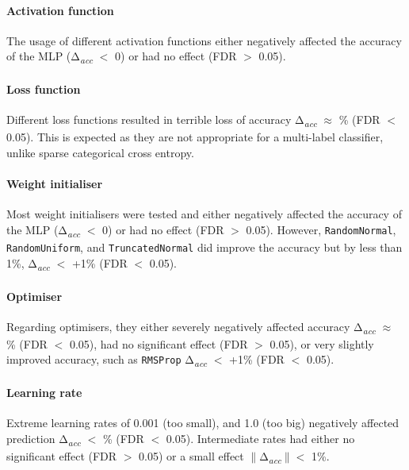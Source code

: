 \paragraph{Activation function}

The usage of different activation functions either negatively affected the accuracy of the MLP (Δ\textsubscript{\textit{acc}} $<$ 0) or had no effect (FDR $>$ 0.05).

\paragraph{Loss function}

Different loss functions resulted in terrible loss of accuracy Δ\textsubscript{\textit{acc}} $\approx$ \% (FDR $<$ 0.05). This is expected as they are not appropriate for a multi-label classifier, unlike sparse categorical cross entropy.

\paragraph{Weight initialiser}

Most weight initialisers were tested and either negatively affected the accuracy of the MLP (Δ\textsubscript{\textit{acc}} $<$ 0) or had no effect (FDR $>$ 0.05). However, \texttt{RandomNormal}, \texttt{RandomUniform}, and \texttt{TruncatedNormal} did improve the accuracy but by less than 1\%, Δ\textsubscript{\textit{acc}} $<$ +1\% (FDR $<$ 0.05).

\paragraph{Optimiser}

Regarding optimisers, they either severely negatively affected accuracy Δ\textsubscript{\textit{acc}} $\approx$ \% (FDR $<$ 0.05), had no significant effect (FDR $>$ 0.05), or very slightly improved accuracy, such as \texttt{RMSProp} Δ\textsubscript{\textit{acc}} $<$ +1\% (FDR $<$ 0.05).

\paragraph{Learning rate}

Extreme learning rates of 0.001 (too small), and 1.0 (too big) negatively affected prediction Δ\textsubscript{\textit{acc}} $<$ \% (FDR $<$ 0.05). Intermediate rates had either no significant effect (FDR $>$ 0.05) or a small effect $\|$Δ\textsubscript{\textit{acc}}$\| <$ 1\%.

